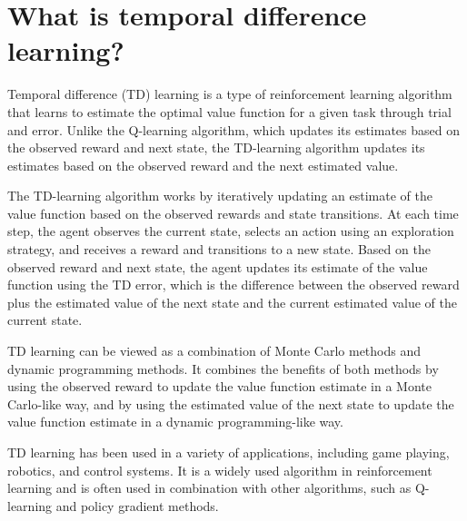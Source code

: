\section{What is temporal difference learning?}
Temporal difference (TD) learning is a type of reinforcement learning algorithm that learns to estimate the optimal value function for a given task through trial and error. Unlike the Q-learning algorithm, which updates its estimates based on the observed reward and next state, the TD-learning algorithm updates its estimates based on the observed reward and the next estimated value.

The TD-learning algorithm works by iteratively updating an estimate of the value function based on the observed rewards and state transitions. At each time step, the agent observes the current state, selects an action using an exploration strategy, and receives a reward and transitions to a new state. Based on the observed reward and next state, the agent updates its estimate of the value function using the TD error, which is the difference between the observed reward plus the estimated value of the next state and the current estimated value of the current state.

TD learning can be viewed as a combination of Monte Carlo methods and dynamic programming methods. It combines the benefits of both methods by using the observed reward to update the value function estimate in a Monte Carlo-like way, and by using the estimated value of the next state to update the value function estimate in a dynamic programming-like way.

TD learning has been used in a variety of applications, including game playing, robotics, and control systems. It is a widely used algorithm in reinforcement learning and is often used in combination with other algorithms, such as Q-learning and policy gradient methods.

